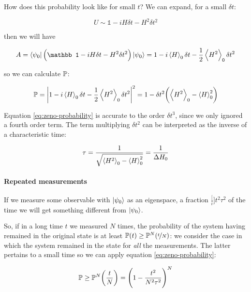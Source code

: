 \documentclass[main.tex]{subfiles}
\begin{document}
How does this probability look like for small \(t\)? We can expand, for a small \(\delta{t}\):

\begin{equation}
    U \sim \mathbb 1 -i H \delta{t} - H^2 \delta t^2
\end{equation}

then we will have

\begin{equation}
    A = \bra{\psi_0}  \qty(\mathbb 1 -i H \delta{t} - H^2 \delta t^2) \ket{\psi_0}
    = 1 -i \expval{H}_0 \delta{t} - \frac{1}{2}  \expval{H^2} _0 \delta t^2
\end{equation}

so we can calculate \(\P\):

\begin{equation} \label{eq:zeno-probability}
    \P = \abs{1 -i \expval{H}_0 \delta{t} - \frac{1}{2} \expval{H^2} _0 \delta t^2}^2
    = 1 - \delta t^2 \qty(\expval{H^2} _0 - \expval{H}_0^2)
\end{equation}

Equation \eqref{eq:zeno-probability} is accurate to the order \(\delta t^3\), since we only ignored a fourth order term. The term multiplying \(\delta t^2\) can be interpreted as the inverse of a characteristic time:

\begin{equation}
    \tau = \frac{1}{\sqrt{\expval{H^2} _0 - \expval{H}_0^2}} = \frac{1}{\Delta H _0}
\end{equation}

\paragraph{Repeated measurements}

If we measure some observable with \(\ket{\psi _0}\) as an eigenspace, a fraction \(\frac[i]{t^2}{\tau^2} \) of the time we will get something different from \(\ket{\psi _0} \).

So, if in a long time \(t\) we measured \(N\) times, the probability of the system having remained in the original state is at least \(\P (t) \geq \P^N(\frac[i]{t}{N} )\): we consider the case in which the system remained in the state for \emph{all} the measurements. The latter pertains to a small time so we can apply equation \eqref{eq:zeno-probability}:

\begin{equation}
    \P \geq \P^N\qty(\frac{t}{N}) = \qty(1- \frac{t^2}{N^2 \tau^2} )^N
\end{equation}
\end{document}
